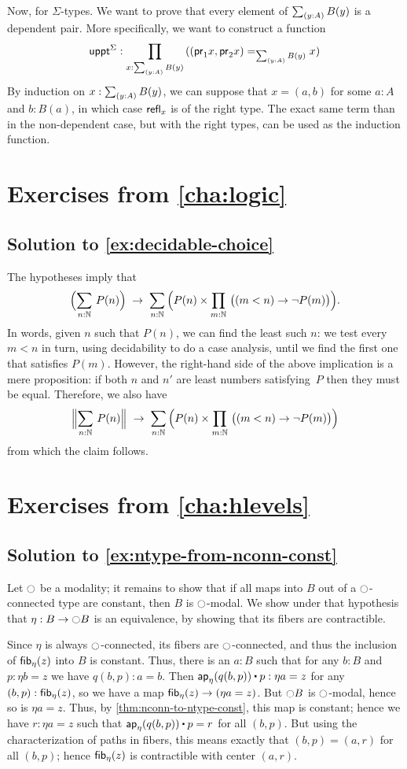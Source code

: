 \documentclass[
%
%
11pt %
]{article}
\begin{document}
Now, for $\Sigma$-types. We want to prove that every element of $\sm{y:A}B(y)$ is a dependent pair. More specifically, we want to construct a function
\[ \uppt^{\Sigma}:\prd{x:\sm{y:A}B(y)} ((\fst x,\snd x)=_{\sm{y:A}B(y)}x) \]
By induction on $x:\sm{y:A}B(y)$, we can suppose that $x=(a,b)$ for some $a:A$ and $b:B(a)$, in which case $\mathsf{refl}_{x}$ is of the right type. The exact same term than in the non-dependent case, but with the right types, can be used as the induction function.

\section*{Exercises from \autoref{cha:logic}}

\subsection*{Solution to \autoref{ex:decidable-choice}}

The hypotheses imply that
\[ \Parens{\sm{n:\nat}P(n)} \;\to\; \sm{n:\nat}\Parens{P(n) \times \prd{m:\nat} \big((m<n) \to \neg P(m)\big)}. \]
In words, given $n$ such that $P(n)$, we can find the least such $n$: we test every $m<n$ in turn, using decidability to do a case analysis, until we find the first one that satisfies $P(m)$.
However, the right-hand side of the above implication is a mere proposition: if both $n$ and $n'$ are least numbers satisfying~$P$ then they must be equal.
Therefore, we also have
\[ \Brck{\sm{n:\nat}P(n)} \;\to\; \sm{n:\nat}\Parens{P(n) \times \prd{m:\nat} \big((m<n) \to \neg P(m)\big)} \]
from which the claim follows.


\section*{Exercises from \autoref{cha:hlevels}}

\subsection*{Solution to \autoref{ex:ntype-from-nconn-const}}

Let $\ocircle$ be a modality; it remains to show that if all maps into $B$ out of a $\ocircle$-connected type are constant, then $B$ is $\ocircle$-modal.
We show under that hypothesis that $\eta:B\to \ocircle B$ is an equivalence, by showing that its fibers are contractible.

Since $\eta$ is always $\ocircle$-connected, its fibers are $\ocircle$-connected, and thus the inclusion of ${\mathsf{fib}}_{\eta}(z)$ into $B$ is constant.
Thus, there is an $a:B$ such that for any $b:B$ and $p:\eta b=z$ we have $q(b,p):a=b$.
Then $\apfunc{\eta}(q(b,p))\ct p : \eta a=z$ for any $(b,p):{\mathsf{fib}}_{\eta}(z)$, so we have a map ${\mathsf{fib}}_{\eta}(z) \to (\eta a=z)$.
But $\ocircle B$ is $\ocircle$-modal, hence so is $\eta a = z$.
Thus, by \autoref{thm:nconn-to-ntype-const}, this map is constant; hence we have $r:\eta a=z$ such that $\apfunc{\eta}(q(b,p))\ct p = r$ for all $(b,p)$.
But using the characterization of paths in fibers, this means exactly that $(b,p)=(a,r)$ for all $(b,p)$; hence ${\mathsf{fib}}_{\eta}(z)$ is contractible with center $(a,r)$.
\end{document}
